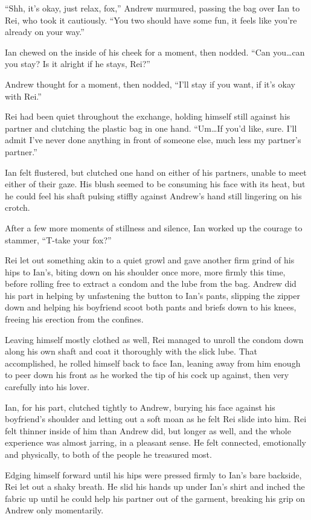 ``Shh, it's okay, just relax, fox,'' Andrew murmured, passing the bag over Ian to Rei, who took it cautiously. ``You two should have some fun, it feels like you're already on your way.''

Ian chewed on the inside of his cheek for a moment, then nodded. ``Can you\ldots{}can you stay? Is it alright if he stays, Rei?''

Andrew thought for a moment, then nodded, ``I'll stay if you want, if it's okay with Rei.''

Rei had been quiet throughout the exchange, holding himself still against his partner and clutching the plastic bag in one hand. ``Um\ldots{}If you'd like, sure. I'll admit I've never done anything in front of someone else, much less my partner's partner.''

Ian felt flustered, but clutched one hand on either of his partners, unable to meet either of their gaze. His blush seemed to be consuming his face with its heat, but he could feel his shaft pulsing stiffly against Andrew's hand still lingering on his crotch.

After a few more moments of stillness and silence, Ian worked up the courage to stammer, ``T-take your fox?''

Rei let out something akin to a quiet growl and gave another firm grind of his hips to Ian's, biting down on his shoulder once more, more firmly this time, before rolling free to extract a condom and the lube from the bag. Andrew did his part in helping by unfastening the button to Ian's pants, slipping the zipper down and helping his boyfriend scoot both pants and briefs down to his knees, freeing his erection from the confines.

Leaving himself mostly clothed as well, Rei managed to unroll the condom down along his own shaft and coat it thoroughly with the slick lube. That accomplished, he rolled himself back to face Ian, leaning away from him enough to peer down his front as he worked the tip of his cock up against, then very carefully into his lover.

Ian, for his part, clutched tightly to Andrew, burying his face against his boyfriend's shoulder and letting out a soft moan as he felt Rei slide into him. Rei felt thinner inside of him than Andrew did, but longer as well, and the whole experience was almost jarring, in a pleasant sense. He felt connected, emotionally and physically, to both of the people he treasured most.

Edging himself forward until his hips were pressed firmly to Ian's bare backside, Rei let out a shaky breath. He slid his hands up under Ian's shirt and inched the fabric up until he could help his partner out of the garment, breaking his grip on Andrew only momentarily.

